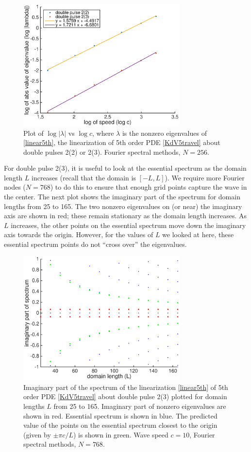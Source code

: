 \documentclass[12pt]{article}
\begin{document}
\begin{figure}[H]
	\includegraphics[width=8.5cm]{eigvsspeed}
	\caption{Plot of $\log{|\lambda|}$ vs $\log{c}$, where $\lambda$ is the nonzero eigenvalues of \eqref{linear5th}, the linearization of 5th order PDE \eqref{KdV5travel} about double pulses 2(2) or 2(3). Fourier spectral methods, $N = 256$.}
	\label{eigvsspeed}
\end{figure}

For double pulse 2(3), it is useful to look at the essential spectrum as the domain length $L$ increases (recall that the domain is $[-L, L]$). We require more Fourier nodes ($N = 768$) to do this to ensure that enough grid points capture the wave in the center. The next plot shows the imaginary part of the spectrum for domain lengths from 25 to 165. The two nonzero eigenvalues on (or near) the imaginary axis are shown in red; these remain stationary as the domain length increases. As $L$ increases, the other points on the essential spectrum move down the imaginary axis towards the origin. However, for the values of $L$ we looked at here, these essential spectrum points do not ``cross over'' the eigenvalues. 

\begin{figure}[H]\label{essspecL}
	\includegraphics[width=8.5cm]{essspecL}
	\caption{Imaginary part of the spectrum of the linearization \eqref{linear5th} of 5th order PDE \eqref{KdV5travel} about double pulse 2(3) plotted for domain lengths $L$ from 25 to 165. Imaginary part of nonzero eigenvalues are shown in red. Essential spectrum is shown in blue. The predicted value of the points on the essential spectrum closest to the origin (given by $\pm \pi c/L$) is shown in green. Wave speed $c = 10$, Fourier spectral methods, $N = 768$.}
	\label{essspecL}
\end{figure}
\end{document}
